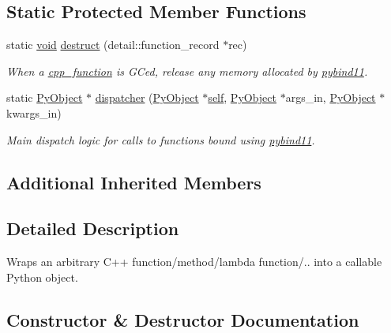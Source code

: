 \subsection*{Static Protected Member Functions}
\begin{DoxyCompactItemize}
\item 
static \mbox{\hyperlink{_s_d_l__opengles2__gl2ext_8h_ae5d8fa23ad07c48bb609509eae494c95}{void}} \mbox{\hyperlink{classcpp__function_a61bdafab94b0fa0bad23c5161e7f9e59}{destruct}} (detail\+::function\+\_\+record $\ast$rec)
\begin{DoxyCompactList}\small\item\em When a \mbox{\hyperlink{classcpp__function}{cpp\+\_\+function}} is G\+Ced, release any memory allocated by \mbox{\hyperlink{namespacepybind11}{pybind11}}. \end{DoxyCompactList}\item 
static \mbox{\hyperlink{_python27_2object_8h_aadc84ac7aed2cfa6f20c25f62bf3dac7}{Py\+Object}} $\ast$ \mbox{\hyperlink{classcpp__function_ab1792b64255d0159f38853a6d8f508bb}{dispatcher}} (\mbox{\hyperlink{_python27_2object_8h_aadc84ac7aed2cfa6f20c25f62bf3dac7}{Py\+Object}} $\ast$\mbox{\hyperlink{modsupport_8h_a0180ca1808366e5da641475e8bf8cca3}{self}}, \mbox{\hyperlink{_python27_2object_8h_aadc84ac7aed2cfa6f20c25f62bf3dac7}{Py\+Object}} $\ast$args\+\_\+in, \mbox{\hyperlink{_python27_2object_8h_aadc84ac7aed2cfa6f20c25f62bf3dac7}{Py\+Object}} $\ast$kwargs\+\_\+in)
\begin{DoxyCompactList}\small\item\em Main dispatch logic for calls to functions bound using \mbox{\hyperlink{namespacepybind11}{pybind11}}. \end{DoxyCompactList}\end{DoxyCompactItemize}
\subsection*{Additional Inherited Members}


\subsection{Detailed Description}
Wraps an arbitrary C++ function/method/lambda function/.. into a callable Python object. 

\subsection{Constructor \& Destructor Documentation}
\mbox{\label{classcpp__function_ae280a9823b07b3832e8d7e786a863bf4}} 

